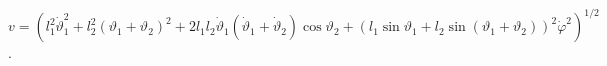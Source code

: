 \\
$v = \left(l^2_1 \dot{\vartheta}^2_1 +
l^2_2(\vartheta _1 + \vartheta _2)^2 +
2l_1l_2\dot{\vartheta}_1(\dot{\vartheta}_1 +
\dot{\vartheta}_2)\cos{\vartheta_2} +
(l_1\sin{\vartheta _1} + l_2\sin{(\vartheta _1 + \vartheta _2)})^2
\dot{\varphi}^2\right) ^{1/2}$.
